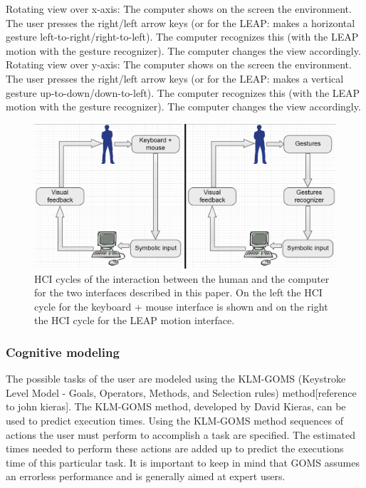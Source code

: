 \newline\newline
Rotating view over x-axis: 
\newline The computer shows on the screen the environment. The user presses the right/left arrow keys (or for the LEAP: makes a horizontal gesture left-to-right/right-to-left). The computer recognizes this (with the LEAP motion with the gesture recognizer). The computer changes the view accordingly.
\newline\newline
Rotating view over y-axis: 
\newline The computer shows on the screen the environment. The user presses the right/left arrow keys (or for the LEAP: makes a vertical gesture up-to-down/down-to-left). The computer recognizes this (with the LEAP motion with the gesture recognizer). The computer changes the view accordingly.

\begin{figure}[H]
\centering
\includegraphics[width=\textwidth]{imgs/HCIcycles.png}
\caption{ \label{fig:HCIcycles} HCI cycles of the interaction between the human and the computer for the two interfaces described in this paper. On the left the HCI cycle for the keyboard + mouse interface is shown and on the right the HCI cycle for the LEAP motion interface.}
\end{figure}

\subsubsection{Cognitive modeling}
The possible tasks of the user are modeled using the KLM-GOMS (Keystroke Level Model - Goals, Operators, Methods, and Selection rules) method[reference to john kieras]. The KLM-GOMS method, developed by David Kieras, can be used to predict execution times. Using the KLM-GOMS method sequences of actions the user must perform to accomplish a task are specified. The estimated times needed to perform these actions are added up to predict the executions time of this particular task. It is important to keep in mind that GOMS assumes an errorless performance and is generally aimed at expert users.

